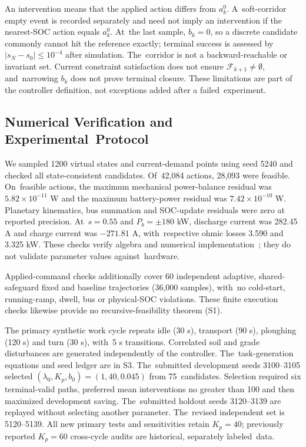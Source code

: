 \documentclass[energies,article,submit,moreauthors]{Definitions/mdpi}
\begin{document}
An intervention means that the applied action differs from $a_k^0$. A~soft-corridor empty event is recorded separately and need not imply an intervention if the nearest-SOC action equals $a_k^0$. At~the last sample, $b_k=0$, so a discrete candidate commonly cannot hit the reference exactly; terminal success is assessed by $|s_N-s_0|\leq10^{-4}$ after simulation. The~corridor is not a backward-reachable or invariant set. Current constraint satisfaction does not ensure $\mathcal{F}_{k+1}\ne\emptyset$, and~narrowing $b_k$ does not prove terminal closure. These limitations are part of the controller definition, not exceptions added after a failed~experiment.

\subsection{Numerical Verification and Experimental~Protocol}
We sampled 1200 virtual states and current-demand points using seed 5240 and checked all state-consistent candidates. Of~42,084 actions, 28,093 were feasible. On~feasible actions, the maximum mechanical power-balance residual was $5.82\times10^{-11}$ W and the maximum battery-power residual was $7.42\times10^{-10}$ W. Planetary kinematics, bus summation and SOC-update residuals were zero at reported precision. At~$s=0.55$ and $P_b=\pm180$ kW, discharge current was 282.45 A and charge current was $-271.81$ A, with~respective ohmic losses 3.590 and 3.325 kW. These checks verify algebra and numerical implementation~\cite{sargent2013}; they do not validate parameter values against~hardware.

Applied-command checks additionally cover 60 independent adaptive, shared-safeguard fixed and baseline trajectories (36,000 samples), with~no cold-start, running-ramp, dwell, bus or physical-SOC violations. These finite execution checks likewise provide no recursive-feasibility theorem (S1).

The primary synthetic work cycle repeats idle (30 s), transport (90 s), ploughing (120 s) and turn (30 s), with~5 s transitions. Correlated soil and grade disturbances are generated independently of the controller. The~task-generation equations and seed ledger are in S3. The~submitted development seeds 3100--3105 selected $(\lambda_0,K_p,b_0)=(1,40,0.045)$ from 75~candidates. Selection required six terminal-valid paths, preferred mean interventions no greater than 100 and then maximized development saving. The~submitted holdout seeds 3120--3139 are replayed without selecting another parameter. The~revised independent set is 5120--5139. All new primary tests and sensitivities retain $K_p=40$; previously reported $K_p=60$ cross-cycle audits are historical, separately labeled~data.
\end{document}
